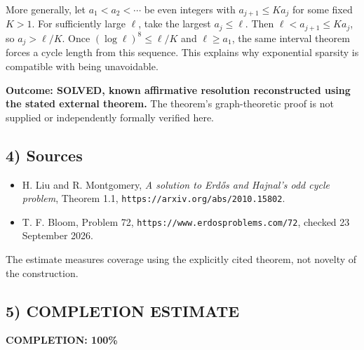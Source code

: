 More generally, let $a_1<a_2<\cdots$ be even integers with
$a_{j+1}\leq K a_j$ for some fixed $K>1$. For sufficiently large
$\ell$, take the largest $a_j\leq\ell$. Then
$\ell<a_{j+1}\leq K a_j$, so $a_j>\ell/K$. Once
$(\log\ell)^8\leq\ell/K$ and $\ell\geq a_1$, the same interval
theorem forces a cycle length from this sequence. This explains why
exponential sparsity is compatible with being unavoidable.

\textbf{Outcome: SOLVED, known affirmative resolution reconstructed
using the stated external theorem.} The theorem's graph-theoretic
proof is not supplied or independently formally verified here.

\subsection{4) Sources}
\begin{itemize}
\item H. Liu and R. Montgomery, \emph{A solution to Erd\H{o}s and
Hajnal's odd cycle problem}, Theorem 1.1,
\texttt{https://arxiv.org/abs/2010.15802}.
\item T. F. Bloom, Problem 72,
\texttt{https://www.erdosproblems.com/72}, checked 23 September 2026.
\end{itemize}
The estimate measures coverage using the explicitly cited theorem,
not novelty of the construction.
\subsection{5) COMPLETION ESTIMATE}
\textbf{COMPLETION: 100\%}
